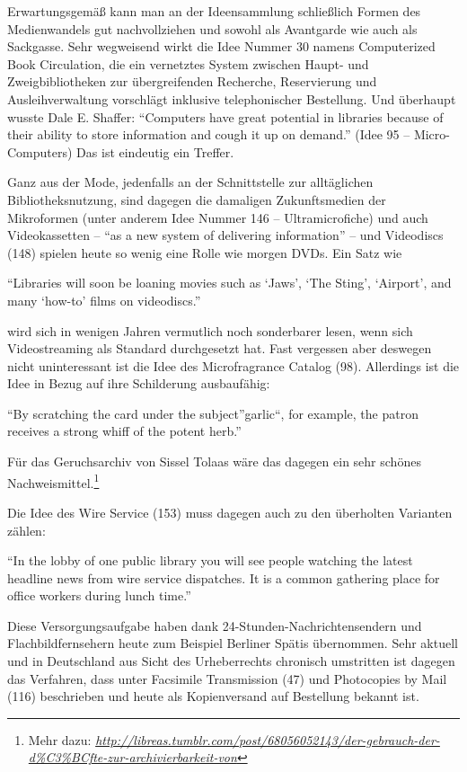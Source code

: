 \documentclass[a4paper,
fontsize=11pt,
oneside,
numbers=noperiodatend,
parskip=half-,
bibliography=totoc,
final
]{scrartcl}
\begin{document}
Erwartungsgemäß kann man an der Ideensammlung schließlich Formen des
Medienwandels gut nachvollziehen und sowohl als Avantgarde wie auch als
Sackgasse. Sehr wegweisend wirkt die Idee Nummer 30 namens Computerized
Book Circulation, die ein vernetztes System zwischen Haupt- und
Zweigbibliotheken zur übergreifenden Recherche, Reservierung und
Ausleihverwaltung vorschlägt inklusive telephonischer Bestellung. Und
überhaupt wusste Dale E. Shaffer: \enquote{Computers have great
potential in libraries because of their ability to store information and
cough it up on demand.} (Idee 95 -- Micro-Computers) Das ist eindeutig
ein Treffer.

Ganz aus der Mode, jedenfalls an der Schnittstelle zur alltäglichen
Bibliotheksnutzung, sind dagegen die damaligen Zukunftsmedien der
Mikroformen (unter anderem Idee Nummer 146 -- Ultramicrofiche) und auch
Videokassetten -- \enquote{as a new system of delivering information} --
und Videodiscs (148) spielen heute so wenig eine Rolle wie morgen DVDs.
Ein Satz wie

\enquote{Libraries will soon be loaning movies such as \enquote{Jaws},
\enquote{The Sting}, \enquote{Airport}, and many \enquote{how-to} films
on videodiscs.}

wird sich in wenigen Jahren vermutlich noch sonderbarer lesen, wenn sich
Videostreaming als Standard durchgesetzt hat. Fast vergessen aber
deswegen nicht uninteressant ist die Idee des Microfragrance Catalog
(98). Allerdings ist die Idee in Bezug auf ihre Schilderung ausbaufähig:

\enquote{By scratching the card under the subject}garlic\enquote{, for
example, the patron receives a strong whiff of the potent herb.}

Für das Geruchsarchiv von Sissel Tolaas wäre das dagegen ein sehr
schönes Nachweismittel.\footnote{Mehr dazu:
  \href{http://libreas.tumblr.com/post/68056052143/der-gebrauch-der-d\%C3\%BCfte-zur-archivierbarkeit-von}{\emph{http://libreas.tumblr.com/post/68056052143/der-gebrauch-der-d\%C3\%BCfte-zur-archivierbarkeit-von}}}

Die Idee des Wire Service (153) muss dagegen auch zu den überholten
Varianten zählen:

\enquote{In the lobby of one public library you will see people watching
the latest headline news from wire service dispatches. It is a common
gathering place for office workers during lunch time.}

Diese Versorgungsaufgabe haben dank 24-Stunden-Nachrichtensendern und
Flachbildfernsehern heute zum Beispiel Berliner Spätis übernommen. Sehr
aktuell und in Deutschland aus Sicht des Urheberrechts chronisch
umstritten ist dagegen das Verfahren, dass unter Facsimile Transmission
(47) und Photocopies by Mail (116) beschrieben und heute als
Kopienversand auf Bestellung bekannt ist.
\end{document}
